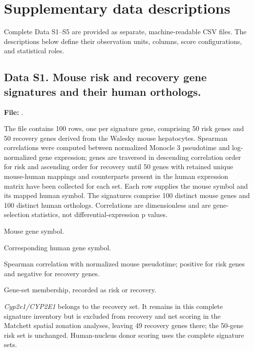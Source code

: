 \clearpage
\section*{Supplementary data descriptions}
\noindent Complete Data S1--S5 are provided as separate, machine-readable CSV files. The descriptions below define their observation units, columns, score configurations, and statistical roles.

\Needspace{135pt}
\subsection*{Data S1. Mouse risk and recovery gene signatures and their human orthologs.}
\label{data:S1}
\noindent\textbf{File:} .\par\smallskip
\noindent The file contains 100 rows, one per signature gene, comprising 50 risk genes and 50 recovery genes derived from the Walesky mouse hepatocytes. Spearman correlations were computed between normalized Monocle 3 pseudotime and log-normalized gene expression; genes are traversed in descending correlation order for risk and ascending order for recovery until 50 genes with retained unique mouse-human mappings and counterparts present in the human expression matrix have been collected for each set. Each row supplies the mouse symbol and its mapped human symbol. The signatures comprise 100 distinct mouse genes and 100 distinct human orthologs. Correlations are dimensionless and are gene-selection statistics, not differential-expression p values.\par\smallskip
\begin{description}
\setlength{\itemsep}{1pt}\setlength{\parsep}{0pt}
\item[\texttt{mouse\_gene}] Mouse gene symbol.
\item[\texttt{human\_gene}] Corresponding human gene symbol.
\item[\texttt{spearman\_rho}] Spearman correlation with normalized mouse pseudotime; positive for risk genes and negative for recovery genes.
\item[\texttt{signature}] Gene-set membership, recorded as risk or recovery.
\end{description}
\noindent \textit{Cyp2e1/CYP2E1} belongs to the recovery set. It remains in this complete signature inventory but is excluded from recovery and net scoring in the Matchett spatial zonation analyses, leaving 49 recovery genes there; the 50-gene risk set is unchanged. Human-nucleus donor scoring uses the complete signature sets.\par\medskip

